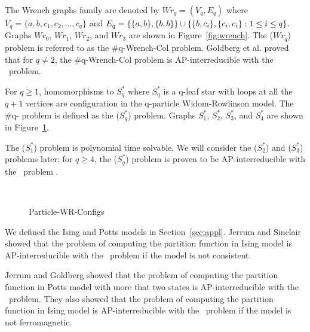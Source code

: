 \begin{example} \label{exm:wrench}
The Wrench graphs family are denoted by \(Wr_q=(V_q, E_q)\) where \(V_q=\{a,b,c_1,c_2,\dotsc,c_q\}\)
and \(E_q=\{{\{{a,b}\},\{{b,b}\}}\} \cup 
\{{\{{b,c_i}\},\{{c_i,c_i}\}:1\le i\le q}\}\)\@.
Graphs \(Wr_0\), \(Wr_1\), \(Wr_2\), and \(Wr_3\) are shown in Figure~\ref{fig:wrench}.
The \chom(\(Wr_q\)) problem is referred to as the \#q-{\sc Wrench-Col} problem. 
Goldberg et al. \cite{Leslie03} proved that for \(q\neq 2\), the  \#q-{\sc Wrench-Col} problem
is AP-interreducible with the \csat\ problem.
\end{example}

\begin{example}  \label{exm:particles}
For \(q \ge 1\), homomorphisms to \(S^*_q\) where
\(S^*_q\) is a q-leaf star with loops at all the \(q+1\)
vertices are configuration in the q-particle Widom-Rowlinson model.
The \#q- problem is defined as the \chom(\(S^*_q\)) problem.
Graphs \(S^*_1\), \(S^*_2\), \(S^*_3\), and \(S^*_4\) are shown in Figure~\ref{fig:wrconfigs}.
 
The \chom(\(S^*_1\)) problem is polynomial time solvable.
We will consider the \chom(\(S^*_2\)) and \chom(\(S^*_3\)) problems later;
for \(q \ge 4\), the \chom(\(S^*_q\)) problem is proven to be AP-interreducible
with the \csat\ problem \cite{Leslie03}.
\end{example}

\begin{figure}[h]
\centering 
\subfigure[\ensuremath{S^*_1}]{\label{fig:ss1}}\hspace{5cm}
\subfigure[\ensuremath{S^*_2}]{\label{fig:ss2}}\\
\subfigure[\ensuremath{S^*_3}]{\label{fig:ss3}}\hspace{5cm}
\subfigure[\ensuremath{S^*_4}]{\label{fig:ss4}}
\caption{Particle-WR-Configs}
\label{fig:wrconfigs}
\end{figure}

We defined the Ising and Potts models in Section~\ref{sec:appl}\@.
Jerrum and Sinclair \cite{Jer93} showed that the problem of computing
the partition function in Ising model is AP-interreducible with the \csat\ problem
if the model is not consistent.

Jerrum and Goldberg \cite{Goldberg2007} showed that the problem of computing 
the partition function in Potts model with more that two states is
AP-interreducible with the \csat\ problem. They also showed that the problem of computing
the partition function in Ising model is AP-interreducible with the \csat\ problem
if the model is not ferromagnetic.

